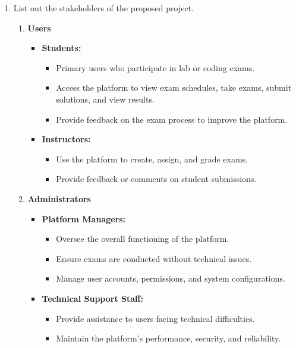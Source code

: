 \documentclass[14pt]{article}
\begin{document}
\begin{enumerate}
\begin{enumerate}
\end{enumerate}
\item List out the stakeholders of the proposed project.
\begin{enumerate}
    \item \textbf{Users}
    \begin{itemize}
        \item \textbf{Students:}
        \begin{itemize}
            \item Primary users who participate in lab or coding exams.
            \item Access the platform to view exam schedules, take exams, submit solutions, and view results.
            \item Provide feedback on the exam process to improve the platform.
        \end{itemize}
        \item \textbf{Instructors:}
        \begin{itemize}
            \item Use the platform to create, assign, and grade exams.
            \item Provide feedback or comments on student submissions.
        \end{itemize}
    \end{itemize}

    \item \textbf{Administrators}
    \begin{itemize}
        \item \textbf{Platform Managers:}
        \begin{itemize}
            \item Oversee the overall functioning of the platform.
            \item Ensure exams are conducted without technical issues.
            \item Manage user accounts, permissions, and system configurations.
        \end{itemize}
        \item \textbf{Technical Support Staff:}
        \begin{itemize}
            \item Provide assistance to users facing technical difficulties.
            \item Maintain the platform’s performance, security, and reliability.
        \end{itemize}
    \end{itemize}


\end{enumerate}
\end{enumerate}
\end{document}
